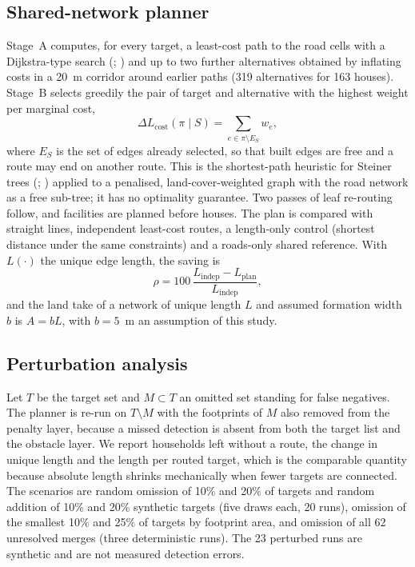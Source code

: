 \subsection{Shared-network planner}
Stage~A computes, for every target, a least-cost path to the road cells with a Dijkstra-type search (\citealt{dijkstra1959note}; \citealt{hart1968astar}) and up to two further alternatives obtained by inflating costs in a 20~m corridor around earlier paths (319 alternatives for 163 houses). Stage~B selects greedily the pair of target and alternative with the highest weight per marginal cost,
\begin{equation}
\Delta L_{\mathrm{cost}}(\pi\mid S)=\sum_{e\in\pi\setminus E_S}w_e,
\label{eq:marginal}
\end{equation}
where $E_S$ is the set of edges already selected, so that built edges are free and a route may end on another route. This is the shortest-path heuristic for Steiner trees (\citealt{kou1981steiner}; \citealt{mehlhorn1988steiner}) applied to a penalised, land-cover-weighted graph with the road network as a free sub-tree; it has no optimality guarantee. Two passes of leaf re-routing follow, and facilities are planned before houses. The plan is compared with straight lines, independent least-cost routes, a length-only control (shortest distance under the same constraints) and a roads-only shared reference. With $L(\cdot)$ the unique edge length, the saving is
\begin{equation}
\rho=100\,\frac{L_{\mathrm{indep}}-L_{\mathrm{plan}}}{L_{\mathrm{indep}}},
\label{eq:saving}
\end{equation}
and the land take of a network of unique length $L$ and assumed formation width $b$ is $A=bL$, with $b=5$~m an assumption of this study.

\subsection{Perturbation analysis}
Let $T$ be the target set and $M\subset T$ an omitted set standing for false negatives. The planner is re-run on $T\setminus M$ with the footprints of $M$ also removed from the penalty layer, because a missed detection is absent from both the target list and the obstacle layer. We report households left without a route, the change in unique length and the length per routed target, which is the comparable quantity because absolute length shrinks mechanically when fewer targets are connected. The scenarios are random omission of 10\% and 20\% of targets and random addition of 10\% and 20\% synthetic targets (five draws each, 20 runs), omission of the smallest 10\% and 25\% of targets by footprint area, and omission of all 62 unresolved merges (three deterministic runs). The 23 perturbed runs are synthetic and are not measured detection errors.

